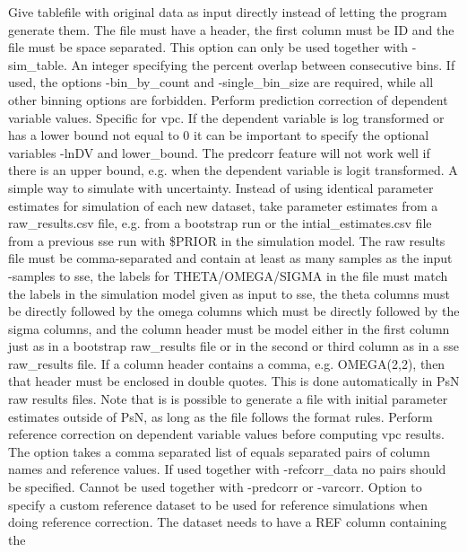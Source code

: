 \begin{optionlist}
\nextopt
{}
Give tablefile with original data as input directly instead of letting the program generate them. The file must have a header, the first column must be ID and the file must be space separated. This option can only be used together with -sim\_table.
\nextopt
{}
An integer specifying the percent overlap between consecutive bins. If used, the options -bin\_by\_count and -single\_bin\_size are required,
while all other binning options are forbidden.
Perform prediction correction of dependent variable values. Specific for vpc. If the dependent variable is log transformed or has a lower bound not equal to 0 it can be important to specify the optional variables -lnDV and lower\_bound. The predcorr feature will not work well if there is an upper bound, e.g. when the dependent variable is logit transformed. 
\nextopt
{}
A simple way to simulate with uncertainty. Instead of using identical parameter estimates for simulation of each new dataset, take parameter estimates from a raw\_results.csv file, e.g. from a bootstrap run or the intial\_estimates.csv file from a previous sse run with \$PRIOR in the simulation model. The raw results file must be comma-separated and contain at least as many samples as the input -samples to sse, the labels for  THETA/OMEGA/SIGMA in the file must match the labels in the simulation model given as input to sse, the theta columns must be directly followed by the omega columns which must be directly followed by the sigma columns, and the column header must be model either in the first column just as in a bootstrap raw\_results file or in the second or third column as in a sse raw\_results file. If a column header contains a comma, e.g. OMEGA(2,2), then that header must be enclosed in double quotes. This is done automatically in PsN raw results files. Note that is is possible to generate a file with initial parameter estimates outside of PsN, as long as the file follows the format rules. 
\nextopt
{}
Perform reference correction on dependent variable values before computing
vpc results. The option takes a comma separated list of equals separated pairs
of column names and reference values. If used together with -refcorr\_data no
pairs should be specified.
Cannot be used together with -predcorr or -varcorr.
\nextopt
{}
Option to specify a custom reference dataset to be used for reference simulations
when doing reference correction. The dataset needs to have a REF column containing the

\end{optionlist}
